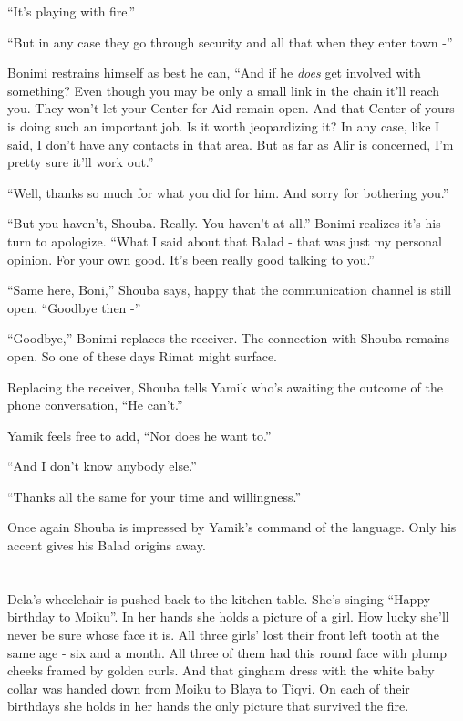 \documentclass[twoside,11pt]{book}
\begin{document}
``It's playing with fire.''

``But in any case they go through security and all that when they enter town -''

Bonimi restrains himself as best he can, ``And if he \textit{does} get involved with something? Even though
you may be only a small link in the chain it'll reach you. They won't let your Center for Aid remain open. And that
Center of yours is doing such an important job. Is it worth jeopardizing it? In any case, like I said, I don't have any
contacts in that area. But as far as Alir is concerned, I'm pretty sure it'll work out.''

``Well, thanks so much for what you did for him. And sorry for bothering you.''

``But you haven't, Shouba. Really. You haven't at all.'' Bonimi realizes it's his turn to
apologize. ``What I said about that Balad - that was just my personal opinion. For your own good. It's
been really good talking to you.''

``Same here, Boni,'' Shouba says, happy that the communication channel is still open.
``Goodbye then -''

``Goodbye,'' Bonimi replaces the receiver. The connection with Shouba remains open. So one of
these days Rimat might surface.

Replacing the receiver, Shouba tells Yamik who's awaiting the outcome of the phone conversation, ``He
can't.''

Yamik feels free to add, ``Nor does he want to.''

``And I don't know anybody else.''

``Thanks all the same for your time and willingness.''

Once again Shouba is impressed by Yamik's command of the language. Only his accent gives his Balad origins away.



\chapter{}

Dela's wheelchair is pushed back to the kitchen table. She's singing ``Happy birthday to
Moiku''.  In her hands she holds a picture of a girl. How lucky she'll never be sure whose face it is. All
three girls' lost their front left tooth at the same age - six and a month. All three of them had this round face with
plump cheeks framed by golden curls. And that gingham dress with the white baby collar was handed down from Moiku to
Blaya to Tiqvi. On each of their birthdays she holds in her hands the only picture that survived the fire.
\end{document}
